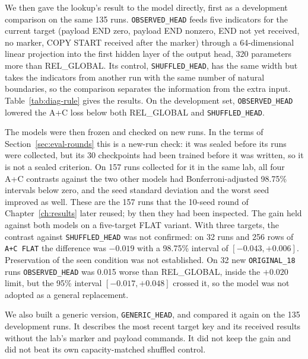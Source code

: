 We then gave the lookup's result to the model directly, first as a
development comparison on the same 135 runs. \texttt{OBSERVED\_HEAD} feeds
five indicators for the current target (payload END zero, payload END
nonzero, END not yet received, no marker, COPY START received after the
marker) through a 64-dimensional linear projection into the first
hidden layer of the output head, 320 parameters more than REL\_GLOBAL.
Its control, \texttt{SHUFFLED\_HEAD}, has the same width but takes the
indicators from another run with the same number of natural boundaries,
so the comparison separates the information from the extra input.
Table~\ref{tab:diag-rule} gives the results. On the development set,
\texttt{OBSERVED\_HEAD} lowered the A+C loss below both REL\_GLOBAL and
\texttt{SHUFFLED\_HEAD}.

The models were then frozen and checked on new runs. In the terms of
Section~\ref{sec:eval-rounds} this is a new-run check: it was sealed
before its runs were collected, but its 30 checkpoints had been trained
before it was written, so it is not a sealed criterion. On 157 runs
collected for it in the same lab, all four A+C contrasts against the two other models
had Bonferroni-adjusted 98.75\% intervals below zero, and the seed
standard deviation and the worst seed improved as well. These are the
157 runs that the 10-seed round of Chapter~\ref{ch:results} later
reused; by then they had been inspected. The gain held against both
models on a five-target FLAT variant. With three targets, the contrast
against \texttt{SHUFFLED\_HEAD} was not confirmed: on 32 runs and 256
rows of \texttt{A+C FLAT} the difference was $-0.019$ with a 98.75\%
interval of $[-0.043, +0.006]$. Preservation of the seen condition was not established. On 32 new
\texttt{ORIGINAL\_18} runs \texttt{OBSERVED\_HEAD} was 0.015 worse than
REL\_GLOBAL, inside the $+0.020$ limit, but the 95\% interval
$[-0.017, +0.048]$ crossed it, so the model was not adopted as a
general replacement.

We also built a generic version, \texttt{GENERIC\_HEAD}, and compared
it again on the 135 development runs. It describes the most recent
target key and its received results without the lab's marker and
payload commands. It did not keep the gain and did not beat its own
capacity-matched shuffled control.

